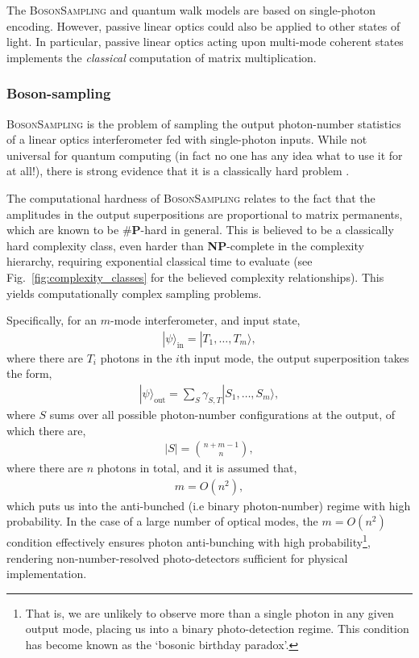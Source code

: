\documentclass[aps,rmp,twocolumn,amsmath,amssymb,nofootinbib,superscriptaddress,longbibliography,floatfix,table-of-contents,eqsecnum]{revtex4-1}
\newcommand{\ket}[1]{|#1\rangle}
\begin{document}
The \textsc{BosonSampling} and quantum walk models are based on single-photon encoding. However, passive linear optics could also be applied to other states of light. In particular, passive linear optics acting upon multi-mode coherent states implements the \textit{classical} computation of matrix multiplication.

%
%

\subsubsection{Boson-sampling} \label{sec:BS} 

\textsc{BosonSampling} is the problem of sampling the output photon-number statistics of a linear optics interferometer fed with single-photon inputs. While not universal for quantum computing (in fact no one has any idea what to use it for at all!), there is strong evidence that it is a classically hard problem \cite{bib:AaronsonArkhipov10, bib:RohdeIntroBS15}.

The computational hardness of \textsc{BosonSampling} relates to the fact that the amplitudes in the output superpositions are proportional to matrix permanents, which are known to be \#\textbf{P}-hard in general. This is believed to be a classically hard complexity class, even harder than \textbf{NP}-complete in the complexity hierarchy, requiring exponential classical time to evaluate (see Fig.~\ref{fig:complexity_classes} for the believed complexity relationships). This yields computationally complex sampling problems.

Specifically, for an $m$-mode interferometer, and input state,
\begin{align}
\ket\psi_\text{in} = \ket{T_1,\dots,T_m},
\end{align}
where there are $T_i$ photons in the $i$th input mode, the output superposition takes the form,
\begin{align}
\ket\psi_\text{out} = \sum_S \gamma_{S,T} \ket{S_1,\dots,S_m},
\end{align}
where $S$ sums over all possible photon-number configurations at the output, of which there are,
\begin{align}
|S| = \binom{n+m-1}{n},
\end{align}
where there are $n$ photons in total, and it is assumed that,
\begin{align}
m=O(n^2),
\end{align}
which puts us into the anti-bunched (i.e binary photon-number) regime with high probability. In the case of a large number of optical modes, the \mbox{$m=O(n^2)$} condition effectively ensures photon anti-bunching with high probability\footnote{That is, we are unlikely to observe more than a single photon in any given output mode, placing us into a binary photo-detection regime. This condition has become known as the `bosonic birthday paradox'.}, rendering non-number-resolved photo-detectors sufficient for physical implementation.
\end{document}
